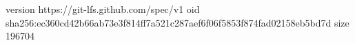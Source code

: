 version https://git-lfs.github.com/spec/v1
oid sha256:ec360cd42b66ab73e3f814ff7a521c287aef6f06f5853f874fad02158eb5bd7d
size 196704

